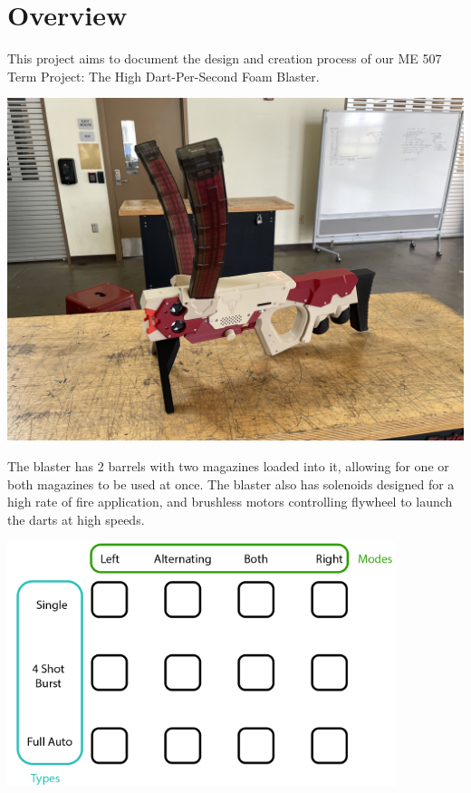 \chapter{Overview}
\hypertarget{index}{}\label{index}
\label{index_md_main}%
%
 This project aims to document the design and creation process of our ME 507 Term Project\+: The High Dart-\/\+Per-\/\+Second Foam Blaster.

 
\begin{DoxyImage}
\includegraphics[width=\textwidth,height=\textheight/2,keepaspectratio=true]{side_view.jpg}
\end{DoxyImage}
   

The blaster has 2 barrels with two magazines loaded into it, allowing for one or both magazines to be used at once. The blaster also has solenoids designed for a high rate of fire application, and brushless motors controlling flywheel to launch the darts at high speeds.

 
\begin{DoxyImage}
\includegraphics[width=\textwidth,height=\textheight/2,keepaspectratio=true]{modes.png}
\end{DoxyImage}
   

